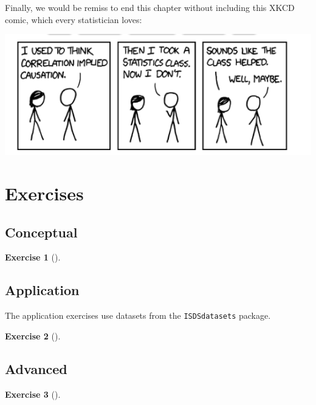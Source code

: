 \documentclass[
  letterpaper,
  DIV=11,
  numbers=noendperiod]{scrreprt}
\theoremstyle{definition}
\newtheorem{exercise}{Exercise}[chapter]
\theoremstyle{remark}
\begin{document}
Finally, we would be remiss to end this chapter without including this
XKCD comic, which every statistician loves:

\includegraphics{images/causation.png}

\hypertarget{sec-ex07}{%
\section{Exercises}\label{sec-ex07}}

\hypertarget{sec-ex07-conceptual}{%
\subsection{Conceptual}\label{sec-ex07-conceptual}}

\leavevmode{}%
\begin{exercise}[]\label{exr-ch07-c01}

\end{exercise}

\hypertarget{sec-ex07-application}{%
\subsection{Application}\label{sec-ex07-application}}

The application exercises use datasets from the \texttt{ISDSdatasets}
package.

\leavevmode{}%
\begin{exercise}[]\label{exr-ch07-app1}

\end{exercise}

\hypertarget{sec-ex07-advanced}{%
\subsection{Advanced}\label{sec-ex07-advanced}}

\leavevmode{}%
\begin{exercise}[]\label{exr-ch07-adv1}

\end{exercise}
\end{document}
